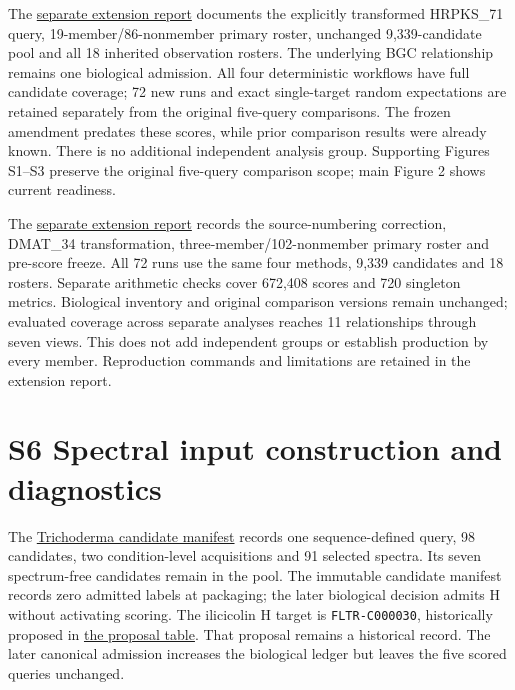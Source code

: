 \documentclass[
  10pt,
  a4paper,
]{article}
\begin{document}
The \href{https://github.com/vinvomero/fungallink-benchmark/blob/main/manuscript/emericellamide-extension-results-2026-10-08.md}{separate extension report} documents the explicitly transformed HRPKS\_71 query, 19-member/86-nonmember primary roster, unchanged 9,339-candidate pool and all 18 inherited observation rosters. The underlying BGC relationship remains one biological admission. All four deterministic workflows have full candidate coverage; 72 new runs and exact single-target random expectations are retained separately from the original five-query comparisons. The frozen amendment predates these scores, while prior comparison results were already known. There is no additional independent analysis group. Supporting Figures S1--S3 preserve the original five-query comparison scope; main Figure 2 shows current readiness.

The \href{https://github.com/vinvomero/fungallink-benchmark/blob/main/manuscript/acetylaszonalenin-extension-results-2026-10-08.md}{separate extension report} records the source-numbering correction, DMAT\_34 transformation, three-member/102-nonmember primary roster and pre-score freeze. All 72 runs use the same four methods, 9,339 candidates and 18 rosters. Separate arithmetic checks cover 672,408 scores and 720 singleton metrics. Biological inventory and original comparison versions remain unchanged; evaluated coverage across separate analyses reaches 11 relationships through seven views. This does not add independent groups or establish production by every member. Reproduction commands and limitations are retained in the extension report.

\section{S6 Spectral input construction and diagnostics}\label{s6-spectral-input-construction-and-diagnostics}

The \href{https://github.com/vinvomero/fungallink-benchmark/blob/main/data/processed/trichoderma-network-candidate-v1/manifest.json}{Trichoderma candidate manifest} records one sequence-defined query, 98 candidates, two condition-level acquisitions and 91 selected spectra. Its seven spectrum-free candidates remain in the pool. The immutable candidate manifest records zero admitted labels at packaging; the later biological decision admits H without activating scoring. The ilicicolin H target is \texttt{FLTR-C000030}, historically proposed in \href{https://github.com/vinvomero/fungallink-benchmark/blob/main/data/processed/trichoderma-network-candidate-v1/proposed_labels/ilicicolin-h-proposal.tsv}{the proposal table}. That proposal remains a historical record. The later canonical admission increases the biological ledger but leaves the five scored queries unchanged.
\end{document}
